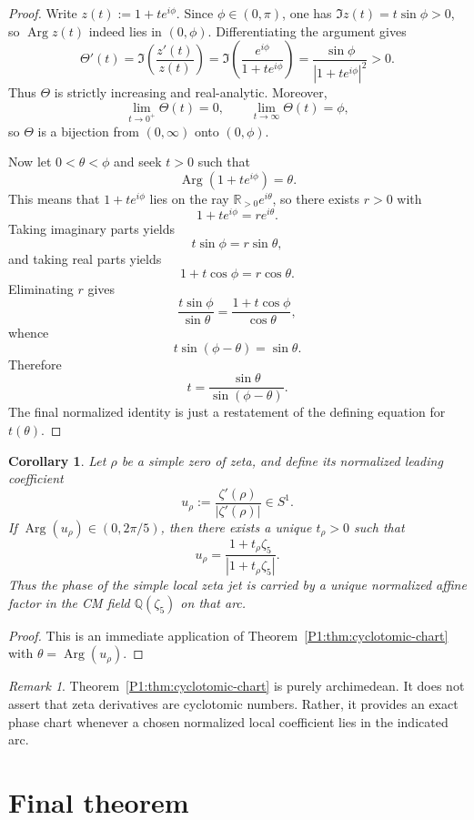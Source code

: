\documentclass[11pt,a4paper]{article}
\numberwithin{equation}{section}
\newtheorem{corollary}[theorem]{Corollary}
\theoremstyle{definition}
\theoremstyle{remark}
\newtheorem{remark}[theorem]{Remark}
\DeclareMathOperator{\Arg}{Arg}
\newcommand{\RR}{\mathbb R}
\newcommand{\QQ}{\mathbb Q}
\begin{document}
\begin{proof}
Write $z(t):=1+t e^{i\phi}$.  Since $\phi\in(0,\pi)$, one has $\Im z(t)=t\sin\phi>0$, so $\Arg z(t)$ indeed lies in $(0,\phi)$.  Differentiating the argument gives
\[
\Theta'(t)=\Im\!\left(\frac{z'(t)}{z(t)}\right)
=\Im\!\left(\frac{e^{i\phi}}{1+t e^{i\phi}}\right)
=\frac{\sin\phi}{|1+t e^{i\phi}|^2}>0.
\]
Thus $\Theta$ is strictly increasing and real-analytic.  Moreover,
\[
\lim_{t\to0^+}\Theta(t)=0,
\qquad
\lim_{t\to\infty}\Theta(t)=\phi,
\]
so $\Theta$ is a bijection from $(0,\infty)$ onto $(0,\phi)$.

Now let $0<\theta<\phi$ and seek $t>0$ such that
\[
\Arg(1+t e^{i\phi})=\theta.
\]
This means that $1+t e^{i\phi}$ lies on the ray $\RR_{>0}e^{i\theta}$, so there exists $r>0$ with
\[
1+t e^{i\phi}=r e^{i\theta}.
\]
Taking imaginary parts yields
\[
t\sin\phi=r\sin\theta,
\]
and taking real parts yields
\[
1+t\cos\phi=r\cos\theta.
\]
Eliminating $r$ gives
\[
\frac{t\sin\phi}{\sin\theta}=\frac{1+t\cos\phi}{\cos\theta},
\]
whence
\[
t\sin(\phi-\theta)=\sin\theta.
\]
Therefore
\[
t=\frac{\sin\theta}{\sin(\phi-\theta)}.
\]
The final normalized identity is just a restatement of the defining equation for $t(\theta)$.
\end{proof}

\begin{corollary}\label{P1:cor:simple-zero-phase-chart}
Let $\rho$ be a simple zero of zeta, and define its normalized leading coefficient
\[
u_\rho:=\frac{\zeta'(\rho)}{|\zeta'(\rho)|}\in S^1.
\]
If $\Arg(u_\rho)\in(0,2\pi/5)$, then there exists a unique $t_\rho>0$ such that
\[
u_\rho=\frac{1+t_\rho\zeta_5}{|1+t_\rho\zeta_5|}.
\]
Thus the phase of the simple local zeta jet is carried by a unique normalized affine factor in the CM field $\QQ(\zeta_5)$ on that arc.
\end{corollary}

\begin{proof}
This is an immediate application of Theorem~\ref{P1:thm:cyclotomic-chart} with $\theta=\Arg(u_\rho)$.
\end{proof}

\begin{remark}
Theorem~\ref{P1:thm:cyclotomic-chart} is purely archimedean.  It does not assert that zeta derivatives are cyclotomic numbers.  Rather, it provides an exact phase chart whenever a chosen normalized local coefficient lies in the indicated arc.
\end{remark}

\section{Final theorem}
\end{document}
